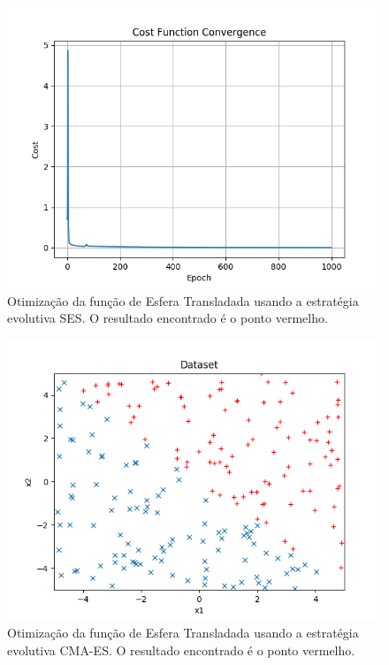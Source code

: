 \documentclass[conference]{IEEEtran}
\begin{document}
\begin{figure}[htbp]
\centering
\centerline{\includegraphics[scale=0.5]{imagens/sum_gt_zero/cost_function_convergence.png}}
\caption{Otimização da função de Esfera Transladada usando a estratégia evolutiva SES. O resultado encontrado é o ponto vermelho.}
\label{sum_gt_zero/cost_function_convergence}
\end{figure}

\begin{figure}[htbp]
\centering
\centerline{\includegraphics[scale=0.5]{imagens/sum_gt_zero/dataset.png}}
\caption{Otimização da função de Esfera Transladada usando a estratégia evolutiva CMA-ES. O resultado encontrado é o ponto vermelho.}
\label{sum_gt_zero/dataset}
\end{figure}
\end{document}
